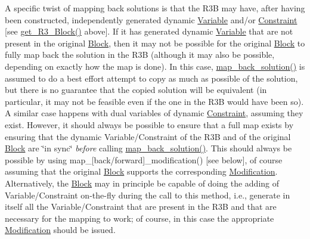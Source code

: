 A specific twist of mapping back solutions is that the R3B may have, after having been constructed, independently generated dynamic \mbox{\hyperlink{class_s_m_spp__di__unipi__it_1_1_variable}{Variable}} and/or \mbox{\hyperlink{class_s_m_spp__di__unipi__it_1_1_constraint}{Constraint}} \mbox{[}see \mbox{\hyperlink{class_s_m_spp__di__unipi__it_1_1_block_a2e682f5c0d4a74503c0cb5ab38fb6428}{get\+\_\+\+R3\+\_\+\+Block()}} above\mbox{]}. If it has generated dynamic \mbox{\hyperlink{class_s_m_spp__di__unipi__it_1_1_variable}{Variable}} that are not present in the original \mbox{\hyperlink{class_s_m_spp__di__unipi__it_1_1_block}{Block}}, then it may not be possible for the original \mbox{\hyperlink{class_s_m_spp__di__unipi__it_1_1_block}{Block}} to fully map back the solution in the R3B (although it may also be possible, depending on exactly how the map is done). In this case, \mbox{\hyperlink{class_s_m_spp__di__unipi__it_1_1_block_a04f0a8a608fcc3ded227c2552f67f1a3}{map\+\_\+back\+\_\+solution()}} is assumed to do a best effort attempt to copy as much as possible of the solution, but there is no guarantee that the copied solution will be equivalent (in particular, it may not be feasible even if the one in the R3B would have been so). A similar case happens with dual variables of dynamic \mbox{\hyperlink{class_s_m_spp__di__unipi__it_1_1_constraint}{Constraint}}, assuming they exist. However, it should always be possible to ensure that a full map exists by ensuring that the dynamic Variable/\+Constraint of the R3B and of the original \mbox{\hyperlink{class_s_m_spp__di__unipi__it_1_1_block}{Block}} are \char`\"{}in sync\char`\"{} {\itshape before} calling \mbox{\hyperlink{class_s_m_spp__di__unipi__it_1_1_block_a04f0a8a608fcc3ded227c2552f67f1a3}{map\+\_\+back\+\_\+solution()}}. This should always be possible by using map\+\_\+\mbox{[}back/forward\mbox{]}\+\_\+modification() \mbox{[}see below\mbox{]}, of course assuming that the original \mbox{\hyperlink{class_s_m_spp__di__unipi__it_1_1_block}{Block}} supports the corresponding \mbox{\hyperlink{class_s_m_spp__di__unipi__it_1_1_modification}{Modification}}. Alternatively, the \mbox{\hyperlink{class_s_m_spp__di__unipi__it_1_1_block}{Block}} may in principle be capable of doing the adding of Variable/\+Constraint on-\/the-\/fly during the call to this method, i.\+e., generate in itself all the Variable/\+Constraint that are present in the R3B and that are necessary for the mapping to work; of course, in this case the appropriate \mbox{\hyperlink{class_s_m_spp__di__unipi__it_1_1_modification}{Modification}} should be issued.

